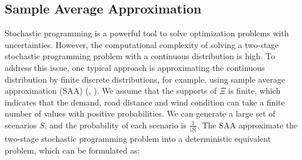 \documentclass[preprint,review,11pt,authoryear]{elsarticle}
\begin{document}
\subsection{Sample Average Approximation} \label{subsec:SAA}
Stochastic programming is a powerful tool to solve optimization problems with uncertainties. However, the computational complexity of solving a two-stage stochastic programming problem with a continuous distribution is high. To address this issue, one typical approach is approximating the continuous distribution by finite discrete distributions, for example, using sample average approximation (SAA) (\cite{birge2011introduction}, \cite{kleywegt2002sample}). We assume that the supports of $\Xi$ is finite, which indicates that the demand, road distance and wind condition can take a finite number of values with positive probabilities. We can generate a large set of scenarios $S$, and the probability of each scenario is $\frac{1}{|S|}$. The SAA approximate the two-stage stochastic programming problem into a deterministic equivalent problem, which can be formulated as:
\footnotesize
\end{document}
